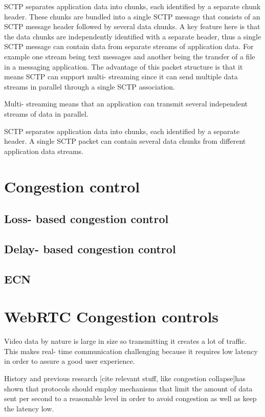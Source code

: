 \documentclass[UKenglish]{ifimaster}
\begin{document}
SCTP separates application data into chunks, each identified by a separate chunk header. 
These chunks are bundled into a single SCTP message that consists of an SCTP message header followed by several data chunks.
A key feature here is that the data chunks are independently identified with a separate header, thus a single SCTP message can contain data from separate streams of application data. For example one stream being text messages and another being the transfer of a file in a messaging application.
The advantage of this packet structure is that it means SCTP can support multi- streaming since it can send multiple data streams in parallel through a single SCTP association. 

Multi- streaming means that an application can transmit several independent streams of data in parallel. 

SCTP separates application data into chunks, each identified by a separate header. 
A single SCTP packet can contain several data chunks from different application data streams.


\section{Congestion control}
\subsection{Loss- based congestion control}
\subsection{Delay- based congestion control}
\subsection{ECN}%
\section{WebRTC Congestion controls}
Video data by nature is large in size so transmitting it creates a lot of traffic. 
This makes real- time communication challenging because it requires low latency in order to assure a good user experience. 

History and previous research [cite relevant stuff, like congestion collapse]has shown that protocols should employ mechanisms that limit the amount of data sent per second to a reasonable level in order to avoid congestion as well as keep the latency low.
\end{document}
